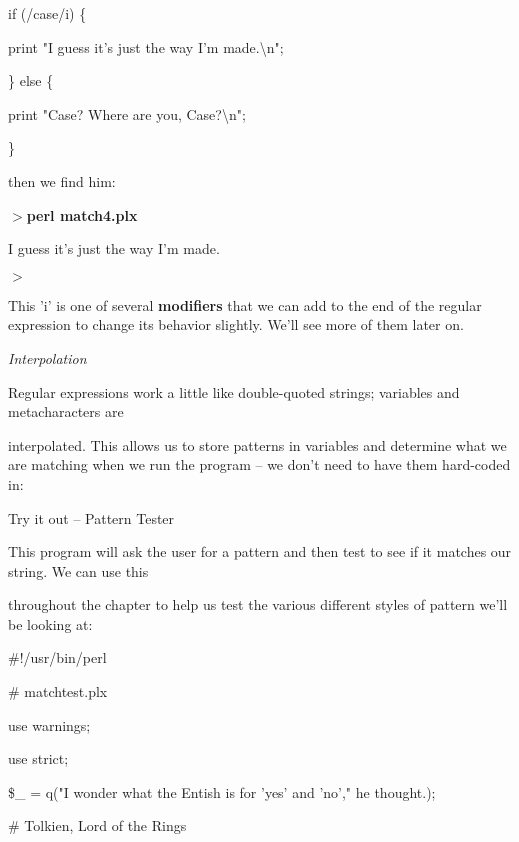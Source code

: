 \documentclass[a4paper,11pt]{book}
\begin{document}
\noindent 

\noindent if (/case/i) \{

\noindent print "I guess it's just the way I'm made.\textbackslash n";

\noindent \} else \{

\noindent print "Case? Where are you, Case?\textbackslash n";

\noindent \}

\noindent 

\noindent then we find him:

\noindent 

\noindent $>$\textbf{perl match4.plx}

\noindent I guess it's just the way I'm made.

\noindent $>$

\noindent 

\noindent This 'i' is one of several \textbf{modifiers }that we can add to the end of the regular expression to change its behavior slightly. We'll see more of them later on.

\noindent 

\noindent \textit{Interpolation}

\noindent Regular expressions work a little like double-quoted strings; variables and metacharacters are

\noindent interpolated. This allows us to store patterns in variables and determine what we are matching when we run the program -- we don't need to have them hard-coded in:

\noindent 

\noindent Try it out -- Pattern Tester

\noindent 

\noindent This program will ask the user for a pattern and then test to see if it matches our string. We can use this

\noindent throughout the chapter to help us test the various different styles of pattern we'll be looking at:

\noindent 

\noindent \#!/usr/bin/perl

\noindent \# matchtest.plx

\noindent use warnings;

\noindent use strict;

\noindent 

\noindent \$\_  = q("I wonder what the Entish is for 'yes' and 'no'," he thought.);

\noindent \# Tolkien, Lord of the Rings
\end{document}
